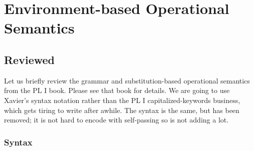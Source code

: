 %
%
\newcommand{\env}{\epsilon}
\newcommand{\store}{\sigma}
\chapter{Environment-based Operational Semantics}\label{ch_opsem}



\section{\Fb{} Reviewed}
\label{opsem_sec_d}

Let us briefly review the grammar and substitution-based operational semantics from the PL I book.  Please see that book for details.  We are going to use Xavier's syntax notation rather than the PL I capitalized-keywords business, which gets tiring to write after awhile.  The syntax is the same, but  has been removed; it is not hard to encode with self-passing so is not adding a lot.

\subsection{\Fb{} Syntax}\label{opsem_sec_syntax}


